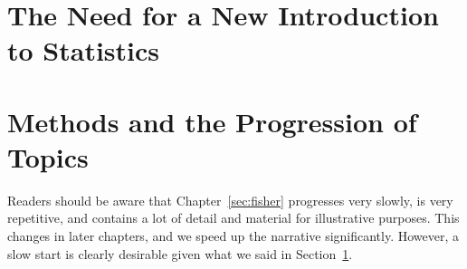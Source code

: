 \addchap{\lsPrefaceTitle}

\section{The Need for a New Introduction to Statistics}\label{sec:need}

\section{Methods and the Progression of Topics}

Readers should be aware that Chapter~\ref{sec:fisher} progresses very slowly, is very repetitive, and contains a lot of detail and material for illustrative purposes.
This changes in later chapters, and we speed up the narrative significantly.
However, a slow start is clearly desirable given what we said in Section~\ref{sec:need}.
